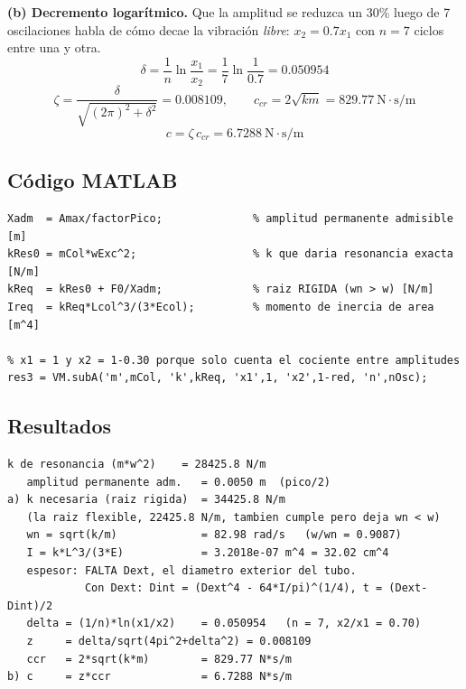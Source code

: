 \documentclass[12pt,letterpaper]{article}
\begin{document}
\textbf{(b) Decremento logarítmico.} Que la amplitud se reduzca un 30\% luego de 7
oscilaciones habla de cómo decae la vibración \emph{libre}: $x_2 = 0.7x_1$ con $n = 7$
ciclos entre una y otra.
\begin{equation}
\delta = \frac{1}{n}\ln\frac{x_1}{x_2} = \frac{1}{7}\ln\frac{1}{0.7} = 0.050954
\end{equation}
\begin{equation}
\zeta = \frac{\delta}{\sqrt{(2\pi)^2 + \delta^2}} = 0.008109, \qquad
c_{cr} = 2\sqrt{km} = 829.77\ \text{N}\cdot\text{s/m}
\end{equation}
\begin{equation}
c = \zeta\,c_{cr} = 6.7288\ \text{N}\cdot\text{s/m}
\end{equation}

\subsection{Código MATLAB}
\begin{lstlisting}[style=matlab,numbers=none]
Xadm  = Amax/factorPico;              % amplitud permanente admisible [m]
kRes0 = mCol*wExc^2;                  % k que daria resonancia exacta [N/m]
kReq  = kRes0 + F0/Xadm;              % raiz RIGIDA (wn > w) [N/m]
Ireq  = kReq*Lcol^3/(3*Ecol);         % momento de inercia de area [m^4]

% x1 = 1 y x2 = 1-0.30 porque solo cuenta el cociente entre amplitudes
res3 = VM.subA('m',mCol, 'k',kReq, 'x1',1, 'x2',1-red, 'n',nOsc);
\end{lstlisting}

\subsection{Resultados}
\begin{lstlisting}[style=consola]
   k de resonancia (m*w^2)    = 28425.8 N/m
   amplitud permanente adm.   = 0.0050 m  (pico/2)
a) k necesaria (raiz rigida)  = 34425.8 N/m
   (la raiz flexible, 22425.8 N/m, tambien cumple pero deja wn < w)
   wn = sqrt(k/m)             = 82.98 rad/s   (w/wn = 0.9087)
   I = k*L^3/(3*E)            = 3.2018e-07 m^4 = 32.02 cm^4
   espesor: FALTA Dext, el diametro exterior del tubo.
            Con Dext: Dint = (Dext^4 - 64*I/pi)^(1/4), t = (Dext-Dint)/2
   delta = (1/n)*ln(x1/x2)    = 0.050954   (n = 7, x2/x1 = 0.70)
   z     = delta/sqrt(4pi^2+delta^2) = 0.008109
   ccr   = 2*sqrt(k*m)        = 829.77 N*s/m
b) c     = z*ccr              = 6.7288 N*s/m
\end{lstlisting}
\end{document}
